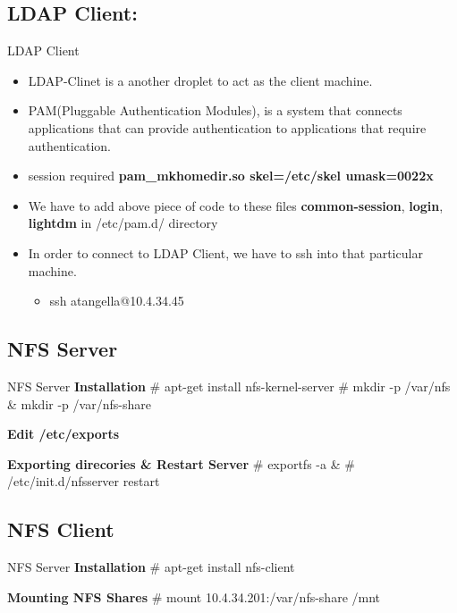 \documentclass[10pt,xcolor=dvipsnames]{beamer}
\begin{document}
\subsection{LDAP Client:}
\begin{frame}{LDAP Client}
	\begin{itemize}
	\item 	LDAP-Clinet is a another droplet to act as the client machine.
	\item PAM(Pluggable Authentication Modules), is a system that connects applications that can provide authentication to applications that require authentication.	\\
	\item session required \textbf{pam\_mkhomedir.so skel=/etc/skel umask=0022x}
	\item We have to add above piece of code to these files  \textbf{common-session}, \textbf{login}, \textbf{lightdm} in /etc/pam.d/ directory
	\item In order to connect to LDAP Client, we have to ssh into that particular machine.
	 \begin{itemize}
	 	\item ssh atangella@10.4.34.45
		\end{itemize}
	\end{itemize}
\end{frame}

\subsection{NFS Server}
\begin{frame}{NFS Server}
\textbf{Installation} \newline
\# apt-get install nfs-kernel-server \newline
\# mkdir -p /var/nfs \& mkdir -p /var/nfs-share \newline

\textbf{Edit /etc/exports}
 
\textbf{Exporting direcories \& Restart Server} \newline
\# exportfs -a \& \# /etc/init.d/nfsserver restart
\end{frame}

\subsection{NFS Client}
\begin{frame}{NFS Server}
\textbf{Installation} \newline
\# apt-get install nfs-client \newline

\textbf{Mounting NFS Shares} \newline
\# mount 10.4.34.201:/var/nfs-share /mnt

\end{frame}
\end{document}
